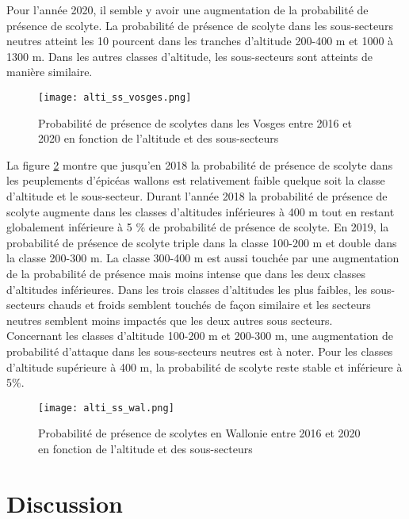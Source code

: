 Pour l'année 2020, il semble y avoir une augmentation de la probabilité de présence de scolyte. La probabilité de présence de scolyte dans les sous-secteurs neutres atteint les 10 pourcent dans les tranches d'altitude 200-400 m et 1000 à 1300 m. Dans les autres classes d'altitude, les sous-secteurs sont atteints de manière similaire.









\begin{figure} [htbp] 
	\centering
	\texttt{[image: alti\_ss\_vosges.png]}
	\caption{Probabilité de présence de scolytes dans les Vosges entre 2016 et 2020 en fonction de l'altitude et des sous-secteurs}
	\label{fig:vosge}
\end{figure}

La figure \ref{fig:wall} montre que jusqu'en 2018 la probabilité de présence de scolyte dans les peuplements d'épicéas wallons est relativement faible quelque soit la classe d'altitude et le sous-secteur. Durant l'année 2018 la probabilité de présence de scolyte augmente dans les classes d'altitudes inférieures à 400 m tout en restant globalement inférieure à 5 \% de probabilité de présence de scolyte.
En 2019, la probabilité de présence de scolyte triple  dans la classe 100-200 m et double dans la classe 200-300 m. La classe 300-400 m est aussi touchée par une augmentation de la probabilité de présence mais moins intense que dans les deux classes d'altitudes inférieures. Dans les trois classes d'altitudes les plus faibles, les sous-secteurs chauds et froids semblent touchés de façon similaire et les secteurs neutres semblent moins impactés que les deux autres sous secteurs. \\

Concernant les classes d'altitude 100-200 m et 200-300 m, une augmentation de probabilité d'attaque dans les sous-secteurs neutres est à noter. 
Pour les classes d'altitude supérieure à 400 m, la probabilité de scolyte reste stable et inférieure à 5\%.
\begin{figure} [htbp] 
	\centering
	\texttt{[image: alti\_ss\_wal.png]}
	\caption{Probabilité de présence de scolytes en Wallonie entre 2016 et 2020 en fonction de l'altitude et des sous-secteurs }
	\label{fig:wall}
\end{figure}


 \section{Discussion}
